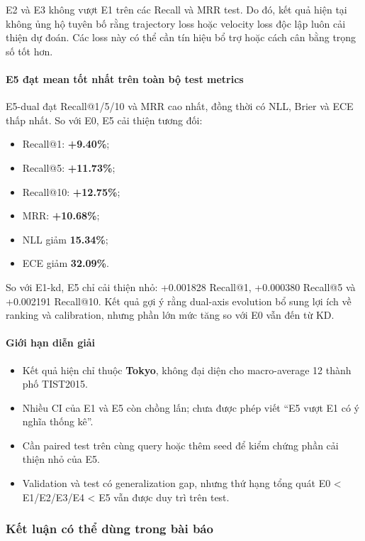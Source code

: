 E2 và E3 không vượt E1 trên các Recall và MRR test. Do đó, kết quả hiện tại không ủng hộ tuyên bố rằng trajectory loss hoặc velocity loss độc lập luôn cải thiện dự đoán. Các loss này có thể cần tín hiệu bổ trợ hoặc cách cân bằng trọng số tốt hơn.

\paragraph{E5 đạt mean tốt nhất trên toàn bộ test metrics}

E5-dual đạt Recall@1/5/10 và MRR cao nhất, đồng thời có NLL, Brier và ECE thấp nhất. So với E0, E5 cải thiện tương đối:

\begin{itemize}
\item Recall@1: \textbf{+9.40\%};
\item Recall@5: \textbf{+11.73\%};
\item Recall@10: \textbf{+12.75\%};
\item MRR: \textbf{+10.68\%};
\item NLL giảm \textbf{15.34\%};
\item ECE giảm \textbf{32.09\%}.
\end{itemize}

So với E1-kd, E5 chỉ cải thiện nhỏ: +0.001828 Recall@1, +0.000380 Recall@5 và +0.002191 Recall@10. Kết quả gợi ý rằng dual-axis evolution bổ sung lợi ích về ranking và calibration, nhưng phần lớn mức tăng so với E0 vẫn đến từ KD.

\paragraph{Giới hạn diễn giải}

\begin{itemize}
\item Kết quả hiện chỉ thuộc \textbf{Tokyo}, không đại diện cho macro-average 12 thành phố TIST2015.
\item Nhiều CI của E1 và E5 còn chồng lấn; chưa được phép viết “E5 vượt E1 có ý nghĩa thống kê”.
\item Cần paired test trên cùng query hoặc thêm seed để kiểm chứng phần cải thiện nhỏ của E5.
\item Validation và test có generalization gap, nhưng thứ hạng tổng quát E0 < E1/E2/E3/E4 < E5 vẫn được duy trì trên test.
\end{itemize}

\subsubsection*{Kết luận có thể dùng trong bài báo}

